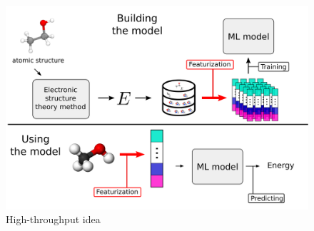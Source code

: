 \begin{figure}
    \includegraphics[width=\textwidth]{fig/slide5_0.png}
    \caption{High-throughput idea}
    \label{fig:high-throughput-scheme}
\end{figure}

